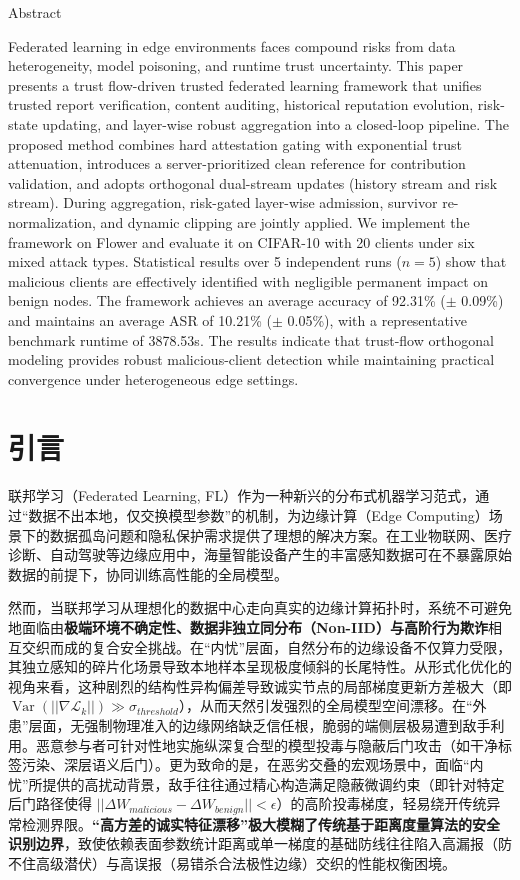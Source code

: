 \documentclass[11pt, a4paper, UTF8, fontset=fandol]{ctexart}
\begin{document}
    \begin{center}
        Abstract
    \end{center}
    Federated learning in edge environments faces compound risks from data
    heterogeneity, model poisoning, and runtime trust uncertainty. This paper presents
    a trust flow-driven trusted federated learning framework that unifies trusted
    report verification, content auditing, historical reputation evolution, risk-state
    updating, and layer-wise robust aggregation into a closed-loop pipeline. The
    proposed method combines hard attestation gating with exponential trust
    attenuation, introduces a server-prioritized clean reference for contribution
    validation, and adopts orthogonal dual-stream updates (history stream and risk
    stream). During aggregation, risk-gated layer-wise admission, survivor re-normalization,
    and dynamic clipping are jointly applied. We implement the framework on Flower and evaluate it on CIFAR-10 with 20 clients
under six mixed attack types. Statistical results over 5 independent runs
($n=5$) show that malicious clients are effectively identified with
negligible permanent impact on benign nodes. The framework achieves an average
accuracy of 92.31\% ($\pm$ 0.09\%) and maintains an average ASR of 10.21\% ($\pm$ 0.05\%), with a
representative benchmark runtime of 3878.53s. The results indicate that
trust-flow orthogonal modeling provides robust malicious-client detection
while maintaining practical convergence under heterogeneous edge settings.

    \section{引言}
联邦学习（Federated Learning, FL）作为一种新兴的分布式机器学习范式，通过“数据不出本地，仅交换模型参数”的机制，为边缘计算（Edge Computing）场景下的数据孤岛问题和隐私保护需求提供了理想的解决方案\cite{kairouz2021flsurvey}。在工业物联网、医疗诊断、自动驾驶等边缘应用中，海量智能设备产生的丰富感知数据可在不暴露原始数据的前提下，协同训练高性能的全局模型。

然而，当联邦学习从理想化的数据中心走向真实的边缘计算拓扑时，系统不可避免地面临由\textbf{极端环境不确定性、数据非独立同分布（Non-IID）与高阶行为欺诈}相互交织而成的复合安全挑战。在“内忧”层面，自然分布的边缘设备不仅算力受限，其独立感知的碎片化场景导致本地样本呈现极度倾斜的长尾特性。从形式化优化的视角来看，这种剧烈的结构性异构偏差导致诚实节点的局部梯度更新方差极大（即 $\operatorname{Var}(|| \nabla \mathcal{L}_k ||) \gg \sigma_{threshold}$），从而天然引发强烈的全局模型空间漂移。在“外患”层面，无强制物理准入的边缘网络缺乏信任根，脆弱的端侧层极易遭到敌手利用。恶意参与者可针对性地实施纵深复合型的模型投毒与隐蔽后门攻击（如干净标签污染、深层语义后门）\cite{gu2017badnets,wang2019neuralcleanse}。更为致命的是，在恶劣交叠的宏观场景中，面临“内忧”所提供的高扰动背景，敌手往往通过精心构造满足隐蔽微调约束（即针对特定后门路径使得 $||\Delta W_{malicious} - \Delta W_{benign}|| < \epsilon$）的高阶投毒梯度，轻易绕开传统异常检测界限。\textbf{“高方差的诚实特征漂移”极大模糊了传统基于距离度量算法的安全识别边界}，致使依赖表面参数统计距离或单一梯度的基础防线往往陷入高漏报（防不住高级潜伏）与高误报（易错杀合法极性边缘）交织的性能权衡困境。
\end{document}
